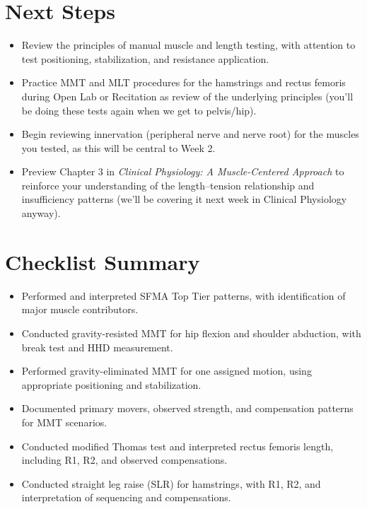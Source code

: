 \section*{Next Steps}

\begin{itemize}
  \item Review the principles of manual muscle and length testing, with attention to test positioning, stabilization, and resistance application.
  \item Practice MMT and MLT procedures for the hamstrings and rectus femoris during Open Lab or Recitation as review of the underlying principles (you'll be doing these tests again when we get to pelvis/hip).
  \item Begin reviewing innervation (peripheral nerve and nerve root) for the muscles you tested, as this will be central to Week 2.
  \item Preview Chapter 3 in \textit{Clinical Physiology: A Muscle-Centered Approach} to reinforce your understanding of the length–tension relationship and insufficiency patterns (we'll be covering it next week in Clinical Physiology anyway).
\end{itemize}

\section*{Checklist Summary}

\begin{itemize}
  \item [$\square$] Performed and interpreted SFMA Top Tier patterns, with identification of major muscle contributors.
  \item [$\square$] Conducted gravity-resisted MMT for hip flexion and shoulder abduction, with break test and HHD measurement.
  \item [$\square$] Performed gravity-eliminated MMT for one assigned motion, using appropriate positioning and stabilization.
  \item [$\square$] Documented primary movers, observed strength, and compensation patterns for MMT scenarios.
  \item [$\square$] Conducted modified Thomas test and interpreted rectus femoris length, including R1, R2, and observed compensations.
  \item [$\square$] Conducted straight leg raise (SLR) for hamstrings, with R1, R2, and interpretation of sequencing and compensations.
\end{itemize}
